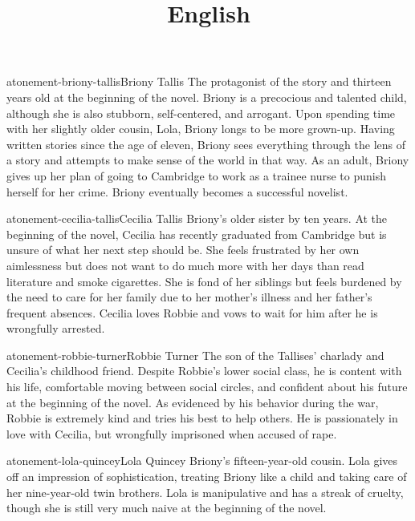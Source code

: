 \documentclass[preview]{standalone}
\begin{document}
\title{English}
\genpage

\begin{snippetcharacter}{atonement-briony-tallis}{Briony Tallis}
    The protagonist of the story and thirteen years old at the beginning of the novel. Briony is a precocious and talented child, although she is also stubborn, self-centered, and arrogant. Upon spending time with her slightly older cousin, Lola, Briony longs to be more grown-up. Having written stories since the age of eleven, Briony sees everything through the lens of a story and attempts to make sense of the world in that way. As an adult, Briony gives up her plan of going to Cambridge to work as a trainee nurse to punish herself for her crime. Briony eventually becomes a successful novelist.
\end{snippetcharacter}

\begin{snippetcharacter}{atonement-cecilia-tallis}{Cecilia Tallis}
    Briony's older sister by ten years. At the beginning of the novel, Cecilia has recently graduated from Cambridge but is unsure of what her next step should be. She feels frustrated by her own aimlessness but does not want to do much more with her days than read literature and smoke cigarettes. She is fond of her siblings but feels burdened by the need to care for her family due to her mother's illness and her father's frequent absences. Cecilia loves Robbie and vows to wait for him after he is wrongfully arrested.
\end{snippetcharacter}

\begin{snippetcharacter}{atonement-robbie-turner}{Robbie Turner}
    The son of the Tallises' charlady and Cecilia's childhood friend. Despite Robbie's lower social class, he is content with his life, comfortable moving between social circles, and confident about his future at the beginning of the novel. As evidenced by his behavior during the war, Robbie is extremely kind and tries his best to help others. He is passionately in love with Cecilia, but wrongfully imprisoned when accused of rape.
\end{snippetcharacter}

\begin{snippetcharacter}{atonement-lola-quincey}{Lola Quincey}
    Briony's fifteen-year-old cousin. Lola gives off an impression of sophistication, treating Briony like a child and taking care of her nine-year-old twin brothers. Lola is manipulative and has a streak of cruelty, though she is still very much naive at the beginning of the novel.
\end{snippetcharacter}
\end{document}
